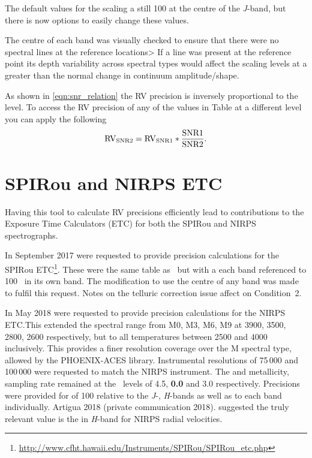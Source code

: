 The default values for the \snr{} scaling a still 100 at the centre of the \textit{J}-band, but there is now options to easily change these values.

The centre of each band was visually checked to ensure that there were no spectral lines at the reference locations> If a line was present at the reference point its depth variability across spectral types would affect the \snr{} scaling levels at a greater than the normal change in continuum amplitude/shape.

As shown in \cref{eqn:snr_relation} the {RV} precision is inversely proportional to the \snr{} level.
To access the {RV} precision of any of the values in Table at a different \snr{} level you can apply the following
\begin{equation}
\rm {RV}_{\textrm{SNR}{}2} = {RV}_{\textrm{SNR}{}1} * \frac{\textrm{SNR}{}1}{\textrm{SNR}{}2}.
\end{equation}

\section{{SPIRou} and {NIRPS} {ETC}}\label{sec:spirou_nirps_etc}
Having this tool to calculate {RV} precisions efficiently lead to contributions to the Exposure Time Calculators (ETC) for both the {SPIRou} and {NIRPS} spectrographs.

In September 2017  were requested to provide precision calculations for the {SPIRou} ETC\footnote{\url{http://www.cfht.hawaii.edu/Instruments/SPIRou/SPIRou_etc.php}}.
These were the same table as~\citet{figueira_radial_2016} but with a each band referenced to 100~{\snr{}} in its own band.
The modification to use the centre of any band was made to fulfil this request.
Notes on the telluric correction issue affect on Condition~2.

In May 2018  were requested to provide precision calculations for the {NIRPS} {ETC}.\@ This extended the spectral range from {M0}, {M3}, {M6}, {M9} at 3900, 3500, 2800, 2600\K{} respectively, but to all temperatures between 2500 and 4000\K{} inclusively.
This provides a finer resolution coverage over the M spectral type, allowed by the {PHOENIX-ACES} library.
Instrumental resolutions of 75\,000 and 100\,000 were requested to match the {NIRPS} instrument.
The \Logg{} and metallicity, sampling rate remained at the~\citet{figueira_radial_2016} levels of 4.5, \textbf{0.0} and 3.0 respectively.\todo{}
Precisions were provided for \snr{} of 100 relative to the \emph{J}-, \emph{H}-bands as well as to each band individually.
Artigua 2018 (private communication 2018).  suggested the truly relevant value is the \snr{} in \emph{H}-band for {NIRPS} radial velocities.

